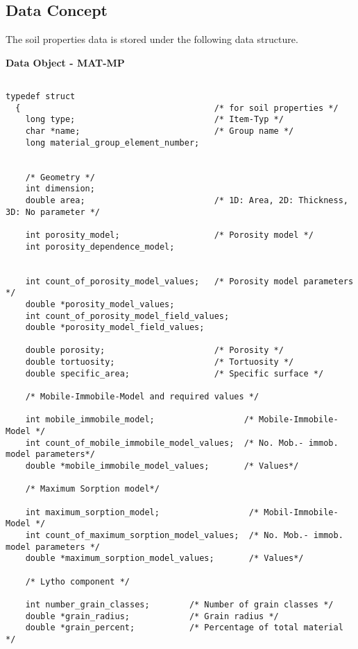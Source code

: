 
\subsection{Data Concept}

The soil properties data is stored under the following data
structure.

\vspace{5mm}

\textbf{Data Object - MAT-MP}


\begin{verbatim}

typedef struct
  {                                       /* for soil properties */
    long type;                            /* Item-Typ */
    char *name;                           /* Group name */
    long material_group_element_number;


    /* Geometry */
    int dimension;
    double area;                          /* 1D: Area, 2D: Thickness, 3D: No parameter */

    int porosity_model;                   /* Porosity model */
    int porosity_dependence_model;


    int count_of_porosity_model_values;   /* Porosity model parameters */
    double *porosity_model_values;
    int count_of_porosity_model_field_values;
    double *porosity_model_field_values;

    double porosity;                      /* Porosity */
    double tortuosity;                    /* Tortuosity */
    double specific_area;                 /* Specific surface */

    /* Mobile-Immobile-Model and required values */

    int mobile_immobile_model;                  /* Mobile-Immobile-Model */
    int count_of_mobile_immobile_model_values;  /* No. Mob.- immob. model parameters*/
    double *mobile_immobile_model_values;       /* Values*/

    /* Maximum Sorption model*/

    int maximum_sorption_model;                  /* Mobil-Immobile-Model */
    int count_of_maximum_sorption_model_values;  /* No. Mob.- immob. model parameters */
    double *maximum_sorption_model_values;       /* Values*/

    /* Lytho component */

    int number_grain_classes;        /* Number of grain classes */
    double *grain_radius;            /* Grain radius */
    double *grain_percent;           /* Percentage of total material */



\end{verbatim}

